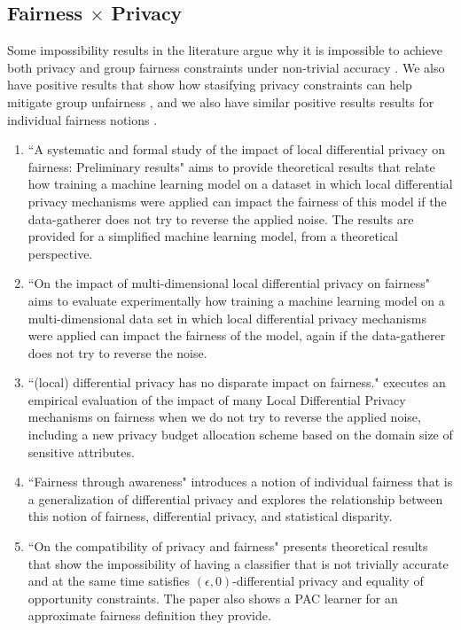 \documentclass[conference]{IEEEtran}
\newcommand{\qm}[1]{``#1"}
\begin{document}
\subsection{Fairness $\times$ Privacy}

Some impossibility results in the literature argue why it is impossible to achieve both privacy and group fairness constraints under non-trivial accuracy \cite{Rachel}. We also have positive results that show how stasifying privacy constraints can help mitigate group unfairness \cite{makhlouf2024systematicformalstudyimpact}\cite{makhlouf2024impact}\cite{arcolezi2023local}, and we also have similar positive results results for individual fairness notions \cite{Awareness}.

\begin{enumerate}
	\item \qm{A systematic and formal study of the impact of local differential privacy on fairness: Preliminary results} \cite{makhlouf2024systematicformalstudyimpact} aims to provide theoretical results that relate how training a machine learning model on a dataset in which local differential privacy mechanisms were applied can impact the fairness of this model if the data-gatherer does not try to reverse the applied noise. The results are provided for a simplified machine learning model, from a theoretical perspective.
	\item \qm{On the impact of multi-dimensional local differential privacy on fairness} \cite{makhlouf2024impact} aims to evaluate experimentally how training a machine learning model on a multi-dimensional data set in which local differential privacy mechanisms were applied can impact the fairness of the model, again if the data-gatherer does not try to reverse the noise.
	\item \qm{(local) differential privacy has no disparate impact on fairness.} \cite{arcolezi2023local} executes an empirical evaluation of the impact of many Local Differential Privacy mechanisms on fairness when we do not try to reverse the applied noise, including a new privacy budget allocation scheme based on the domain size of sensitive attributes.
	\item \qm{Fairness through awareness} \cite{Awareness} introduces a notion of individual fairness that is a generalization of differential privacy and explores the relationship between this notion of fairness, differential privacy, and statistical disparity.
	\item \qm{On the compatibility of privacy and fairness} \cite{Rachel} presents theoretical results that show the impossibility of having a classifier that is not trivially accurate and at the same time satisfies $(\epsilon,0)$-differential privacy and equality of opportunity constraints. The paper also shows a PAC learner for an approximate fairness definition they provide.

\end{enumerate}
\end{document}
